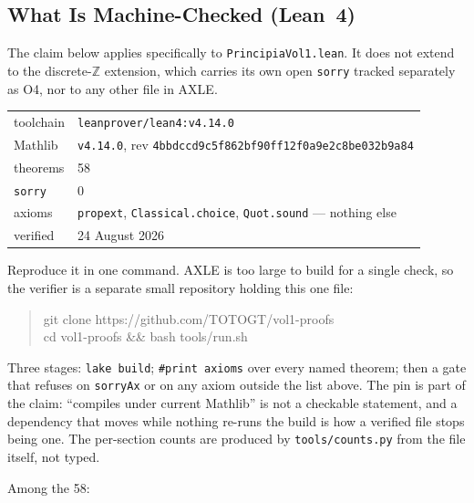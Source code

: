 \documentclass[14pt,a4paper]{extarticle}
\begin{document}
\subsection{What Is Machine-Checked (Lean~4)}

\noindent The claim below applies specifically to
\texttt{PrincipiaVol1.lean}. It does not extend to the
discrete-$\mathbb{Z}$ extension, which carries its own open
\texttt{sorry} tracked separately as O4, nor to any other file in AXLE.

\begin{center}
\begin{tabular}{ll}
\toprule
toolchain & \texttt{leanprover/lean4:v4.14.0}\\
Mathlib   & \texttt{v4.14.0}, rev \texttt{4bbdccd9c5f862bf90ff12f0a9e2c8be032b9a84}\\
theorems  & 58\\
\texttt{sorry} & 0\\
axioms    & \texttt{propext}, \texttt{Classical.choice}, \texttt{Quot.sound} --- nothing else\\
verified  & 24 August 2026\\
\bottomrule
\end{tabular}
\end{center}

\noindent
Reproduce it in one command. AXLE is too large to build for a single
check, so the verifier is a separate small repository holding this one
file:

\begin{quote}\ttfamily\small
git clone https://github.com/TOTOGT/vol1-proofs\\
cd vol1-proofs \&\& bash tools/run.sh
\end{quote}

\noindent
Three stages: \texttt{lake build}; \texttt{\#print axioms} over every named
theorem; then a gate that refuses on \texttt{sorryAx} or on any axiom
outside the list above. The pin is part of the claim: ``compiles under
current Mathlib'' is not a checkable statement, and a dependency that moves
while nothing re-runs the build is how a verified file stops being one. The
per-section counts are produced by \texttt{tools/counts.py} from the file
itself, not typed.

\medskip
\noindent
Among the 58:
\end{document}
